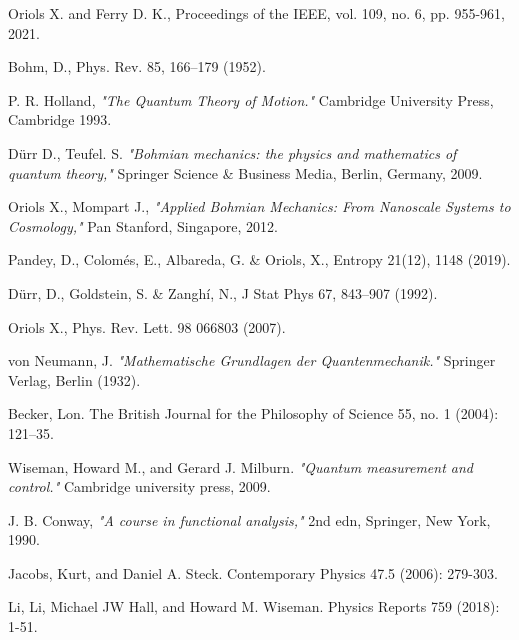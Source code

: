 \documentclass[11pt, a4paper]{article} %
\begin{document}
\newpage
\twocolumn
\begin{thebibliography}{1}
{\footnotesize 

Oriols X. and Ferry D. K., Proceedings of the IEEE, vol. 109, no. 6, pp. 955-961, 2021.

Bohm, D., Phys. Rev. 85, 166–179 (1952).

P. R. Holland, {\em "The Quantum Theory of Motion."} Cambridge University Press, Cambridge 1993.

Dürr D., Teufel. S. {\em "Bohmian mechanics: the physics and mathematics of quantum theory,"} Springer Science \& Business Media, Berlin, Germany, 2009.

	Oriols X., Mompart J., {\em "Applied Bohmian Mechanics: From Nanoscale Systems to Cosmology,"} Pan Stanford, Singapore, 2012.
	
Pandey, D., Colomés, E., Albareda, G. \& Oriols, X., Entropy 21(12), 1148 (2019).

Dürr, D., Goldstein, S. \& Zanghí, N., J Stat Phys 67, 843–907 (1992).

Oriols X., Phys. Rev. Lett. 98 066803 (2007).


von Neumann, J. {\em "Mathematische Grundlagen der Quantenmechanik."} Springer Verlag, Berlin (1932).

Becker, Lon. The British Journal for the Philosophy of Science 55, no. 1 (2004): 121–35.


Wiseman, Howard M., and Gerard J. Milburn. {\em "Quantum measurement and control."} Cambridge university press, 2009.

J. B. Conway, {\em "A course in functional analysis,"} 2nd edn, Springer, New York, 1990.

Jacobs, Kurt, and Daniel A. Steck. Contemporary Physics 47.5 (2006): 279-303.

Li, Li, Michael JW Hall, and Howard M. Wiseman. Physics Reports 759 (2018): 1-51.

}
\end{thebibliography}
\end{document}
